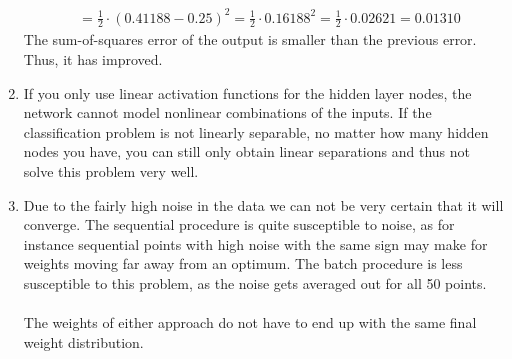 \documentclass[a4paper,10pt]{article}
\numberwithin{equation}{section} %
\numberwithin{figure}{section} %
\numberwithin{table}{section} %
\theoremstyle{mytheor}
\begin{document}
\begin{enumerate}
\begin{align*}
		&= \frac{1}{2} \cdot (0.41188 - 0.25)^2 = \frac{1}{2} \cdot 0.16188^2 = \frac{1}{2} \cdot 0.02621 = 0.01310
		\end{align*}
		The sum-of-squares error of the output is smaller than the previous error. Thus, it has improved.		
	\item If you only use linear activation functions for the hidden layer nodes, the network cannot model nonlinear combinations of the inputs. If the classification problem is not linearly separable, no matter how many hidden nodes you have, you can still only obtain linear separations and thus not solve this problem very well.
	\item Due to the fairly high noise in the data we can not be very certain that it will converge. The sequential procedure is quite susceptible to noise, as for instance sequential points with high noise with the same sign may make for weights moving far away from an optimum. The batch procedure is less susceptible to this problem, as the noise gets averaged out for all 50 points.\\
\\
The weights of either approach do not have to end up with the same final weight distribution.
\end{enumerate}

\end{document}
